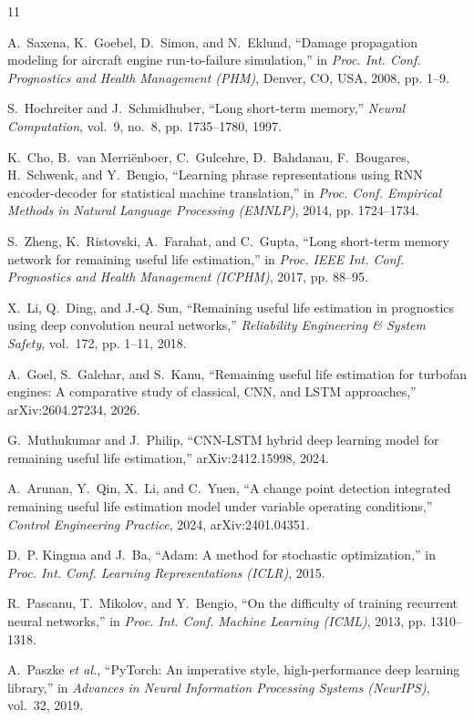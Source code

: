 \documentclass[conference]{IEEEtran}
\begin{document}

\begin{thebibliography}{11}

A.~Saxena, K.~Goebel, D.~Simon, and N.~Eklund, ``Damage propagation modeling for aircraft engine run-to-failure simulation,'' in \emph{Proc. Int. Conf. Prognostics and Health Management (PHM)}, Denver, CO, USA, 2008, pp. 1--9.

S.~Hochreiter and J.~Schmidhuber, ``Long short-term memory,'' \emph{Neural Computation}, vol.~9, no.~8, pp. 1735--1780, 1997.

K.~Cho, B.~van Merri\"enboer, C.~Gulcehre, D.~Bahdanau, F.~Bougares, H.~Schwenk, and Y.~Bengio, ``Learning phrase representations using RNN encoder-decoder for statistical machine translation,'' in \emph{Proc. Conf. Empirical Methods in Natural Language Processing (EMNLP)}, 2014, pp. 1724--1734.

S.~Zheng, K.~Ristovski, A.~Farahat, and C.~Gupta, ``Long short-term memory network for remaining useful life estimation,'' in \emph{Proc. IEEE Int. Conf. Prognostics and Health Management (ICPHM)}, 2017, pp. 88--95.

X.~Li, Q.~Ding, and J.-Q. Sun, ``Remaining useful life estimation in prognostics using deep convolution neural networks,'' \emph{Reliability Engineering \& System Safety}, vol.~172, pp. 1--11, 2018.

A.~Goel, S.~Galchar, and S.~Kanu, ``Remaining useful life estimation for turbofan engines: A comparative study of classical, CNN, and LSTM approaches,'' arXiv:2604.27234, 2026.

G.~Muthukumar and J.~Philip, ``CNN-LSTM hybrid deep learning model for remaining useful life estimation,'' arXiv:2412.15998, 2024.

A.~Arunan, Y.~Qin, X.~Li, and C.~Yuen, ``A change point detection integrated remaining useful life estimation model under variable operating conditions,'' \emph{Control Engineering Practice}, 2024, arXiv:2401.04351.

D.~P. Kingma and J.~Ba, ``Adam: A method for stochastic optimization,'' in \emph{Proc. Int. Conf. Learning Representations (ICLR)}, 2015.

R.~Pascanu, T.~Mikolov, and Y.~Bengio, ``On the difficulty of training recurrent neural networks,'' in \emph{Proc. Int. Conf. Machine Learning (ICML)}, 2013, pp. 1310--1318.

A.~Paszke \emph{et al.}, ``PyTorch: An imperative style, high-performance deep learning library,'' in \emph{Advances in Neural Information Processing Systems (NeurIPS)}, vol.~32, 2019.

\end{thebibliography}
\end{document}
